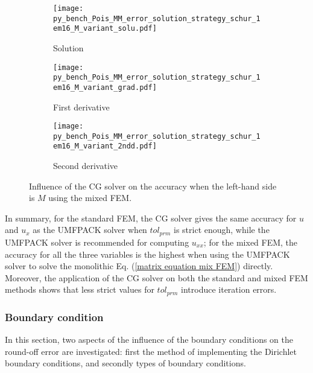 \documentclass[review,3p]{elsarticle}
\begin{document}
\begin{figure}[!ht]
    \begin{subfigure}{5.5cm}
        \texttt{[image: py\_bench\_Pois\_MM\_error\_solution\_strategy\_schur\_1em16\_M\_variant\_solu.pdf]}
        \caption{Solution}
        \label{py_bench_Pois_MM_error_solution_strategy_schur_1em16_M_variant_solu}
    \end{subfigure}
    \hspace{-0.2cm}
    \begin{subfigure}{5.5cm}
        \texttt{[image: py\_bench\_Pois\_MM\_error\_solution\_strategy\_schur\_1em16\_M\_variant\_grad.pdf]}
        \caption{First derivative}
        \label{py_bench_Pois_MM_error_solution_strategy_schur_1em16_M_variant_grad}
    \end{subfigure}
    \hspace{-0.2cm}
    \begin{subfigure}{5.5cm}
        \texttt{[image: py\_bench\_Pois\_MM\_error\_solution\_strategy\_schur\_1em16\_M\_variant\_2ndd.pdf]}
        \caption{Second derivative}
        \label{py_bench_Pois_MM_error_solution_strategy_schur_1em16_M_variant_2ndd}
    \end{subfigure}
\caption{Influence of the CG solver on the accuracy when the left-hand side is $M$ using the mixed FEM.}		%
\label{py_bench_Pois_MM_error_solution_strategy_schur_1em16_M_variant}
\end{figure}

In summary, for the standard FEM, the CG solver gives the same accuracy for $u$ and $u_{x}$ as the UMFPACK solver when $tol_{prm}$ is strict enough, while the UMFPACK solver is recommended for computing $u_{xx}$; for the mixed FEM, the accuracy for all the three variables is the highest when using the UMFPACK solver to solve the monolithic Eq. (\ref{matrix equation mix FEM}) directly. Moreover, the application of the CG solver on both the standard and mixed FEM methods shows that less strict values for $tol_{prm}$ introduce iteration errors.


\subsubsection{Boundary condition}	\label{section_sensitivity_BC}

In this section, two aspects of the influence of the boundary conditions on the round-off error are investigated: first the method of implementing the Dirichlet boundary conditions, and secondly types of boundary conditions. 
\end{document}
